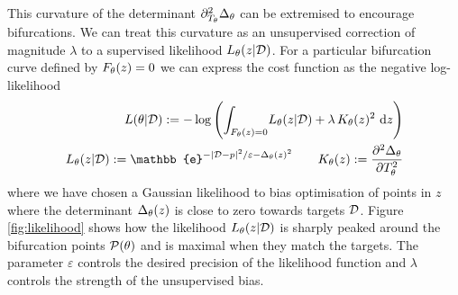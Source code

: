 This curvature of the determinant $\partial_{T_{\theta}}^2\Delta_{\theta}$ can be extremised to encourage bifurcations. We can treat this curvature as an unsupervised correction of magnitude $\lambda$ to a supervised likelihood $L_{\theta}(z|\mathcal{D})$. For a particular bifurcation curve defined by $F_{\theta}(z)=0$ we can express the cost function as the negative log-likelihood
\begin{align}
    \loss(\theta|\targets) := -\log\left(\int_{\rates(z)=0}\!
    L_{\theta}(z|\targets) + \lambda\,K_{\theta}(z)^2\,
    \,\mathrm{d}z\right)\\
    L_{\theta}(z|\targets) := \mathbb{e}^{-|\targets-p|^2/\varepsilon-\Det(z)^2}\qquad
     K_{\theta}(z):=\frac{\partial^2\Det}{\partial\tangent^2}
\end{align}
where we have chosen a Gaussian likelihood to bias optimisation of points in $z$ where the determinant $\Delta_{\theta}(z)$ is close to zero towards targets $\mathcal{D}$. Figure \ref{fig:likelihood} shows how the likelihood $L_{\theta}(z|\mathcal{D})$ is sharply peaked around the bifurcation points $\mathcal{P}(\theta)$ and is maximal when they match the targets. The parameter $\varepsilon$ controls the desired precision of the likelihood function and $\lambda$ controls the strength of the unsupervised bias.

